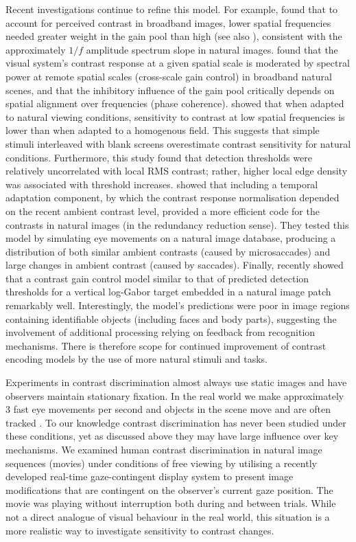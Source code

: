\documentclass[11pt,a4paper]{article}
\begin{document}
Recent investigations continue to refine this model.
For example, \citet{Haun2013a} found that to account for perceived contrast in broadband images, lower spatial frequencies needed greater weight in the gain pool than high (see also \citet{Haun2010, Hansen2012}), consistent with the approximately $1/f$ amplitude spectrum slope in natural images.
\citet{Bex2007} found that the visual system's contrast response at a given spatial scale is moderated by spectral power at remote spatial scales (cross-scale gain control) in broadband natural scenes, and that the inhibitory influence of the gain pool critically depends on spatial alignment over frequencies (phase coherence).
\citet{Bex2009} showed that when adapted to natural viewing conditions, sensitivity to contrast at low spatial frequencies is lower than when adapted to a homogenous field. 
This suggests that simple stimuli interleaved with blank screens overestimate contrast sensitivity for natural conditions.
Furthermore, this study found that detection thresholds were relatively uncorrelated with local RMS contrast; rather, higher local edge density was associated with threshold increases.
\citet{Sinz2013} showed that including a temporal adaptation component, by which the contrast response normalisation depended on the recent ambient contrast level, provided a more efficient code for the contrasts in natural images (in the redundancy reduction sense). 
They tested this model by simulating eye movements on a natural image database, producing a distribution of both similar ambient contrasts (caused by microsaccades) and large changes in ambient contrast (caused by saccades).
Finally, \citet{Alam2014} recently showed that a contrast gain control model similar to that of \citet{Watson1997} predicted detection thresholds for a vertical log-Gabor target embedded in a natural image patch remarkably well.
Interestingly, the model's predictions were poor in image regions containing identifiable objects (including faces and body parts), suggesting the involvement of additional processing relying on feedback from recognition mechanisms.
There is therefore scope for continued improvement of contrast encoding models by the use of more natural stimuli and tasks.

Experiments in contrast discrimination almost always use static images and have observers maintain stationary fixation.
In the real world we make approximately 3 fast eye movements per second \citep[e.g.][]{Heri79,DoMaGeBa10a} and objects in the scene move and are often tracked \citep{Wang2012a}.
To our knowledge contrast discrimination has never been studied under these conditions, yet as discussed above they may have large influence over key mechanisms.
We examined human contrast discrimination in natural image sequences (movies) under conditions of free viewing by utilising a recently developed real-time gaze-contingent display system \citep{Dorr2013} to present image modifications that are contingent on the observer's current gaze position.
The movie was playing without interruption both during and between trials.
While not a direct analogue of visual behaviour in the real world, this situation is a more realistic way to investigate sensitivity to contrast changes.
\end{document}
